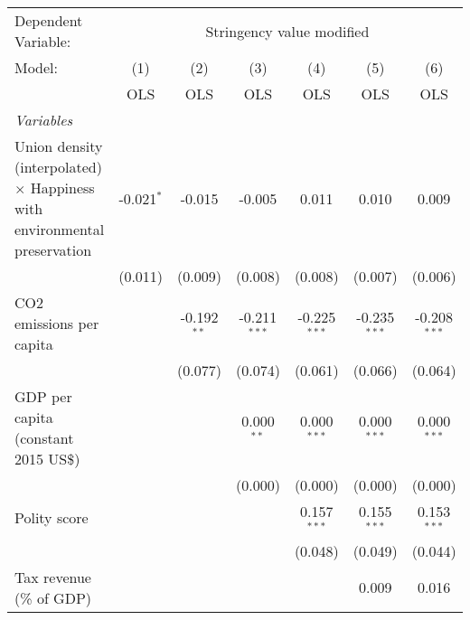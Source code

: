 
\begingroup
\centering
\begin{tabular}{lcccccc}
   \toprule
   Dependent Variable: & \multicolumn{6}{c}{Stringency value modified}\\
   Model:                                                                           & (1)          & (2)           & (3)            & (4)            & (5)            & (6)\\  
                                                                                    &  OLS         & OLS           & OLS            & OLS            & OLS            & OLS\\  
   \midrule
   \emph{Variables}\\
   Union density (interpolated) $\times$ Happiness with environmental preservation  & -0.021$^{*}$ & -0.015        & -0.005         & 0.011          & 0.010          & 0.009\\   
                                                                                    & (0.011)      & (0.009)       & (0.008)        & (0.008)        & (0.007)        & (0.006)\\   
   CO2 emissions per capita                                                         &              & -0.192$^{**}$ & -0.211$^{***}$ & -0.225$^{***}$ & -0.235$^{***}$ & -0.208$^{***}$\\   
                                                                                    &              & (0.077)       & (0.074)        & (0.061)        & (0.066)        & (0.064)\\   
   GDP per capita (constant 2015 US\$)                                              &              &               & 0.000$^{**}$   & 0.000$^{***}$  & 0.000$^{***}$  & 0.000$^{***}$\\   
                                                                                    &              &               & (0.000)        & (0.000)        & (0.000)        & (0.000)\\   
   Polity score                                                                     &              &               &                & 0.157$^{***}$  & 0.155$^{***}$  & 0.153$^{***}$\\   
                                                                                    &              &               &                & (0.048)        & (0.049)        & (0.044)\\   
   Tax revenue (\% of GDP)                                                          &              &               &                &                & 0.009          & 0.016\\   

\end{tabular}
